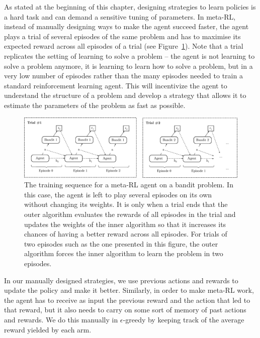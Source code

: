 As stated at the beginning of this chapter, designing strategies to learn
policies is a hard task and can demand a sensitive tuning of parameters.
In meta-RL, instead of manually designing ways to make the agent succeed faster,
the agent plays a trial of several episodes of the same problem and has to
maximise its expected reward across all episodes of a trial (see 
Figure~\ref{fig:meta_bandit_training}). Note that a trial replicates the setting
of learning to solve a problem -- the agent is not learning to solve a 
problem anymore, it is learning to learn how to solve a problem, but in 
a very low number of episodes rather than the many episodes needed 
to train a standard reinforcement learning agent. This will incentivize the agent
to understand the structure of a problem and develop a strategy that allows it 
to estimate the parameters of the problem as fast as possible.\\

\begin{figure}
	\centering
	\includegraphics[width=\linewidth]{fig/meta_bandit_training.eps}
	\caption{The training sequence for a meta-RL agent on a bandit problem.
	In this case, the agent is left to play several episodes on its own
	without changing its weights. It is only when a trial ends that the
	outer algorithm evaluates the rewards of all episodes in the trial and
	updates the weights of the inner algorithm so that it increases its
	chances of having a better reward across all episodes. For trials of 
	two episodes such as the one presented in this figure, the outer
	algorithm forces the inner algorithm to learn the problem in 
	two episodes.}
	\label{fig:meta_bandit_training}
\end{figure}

In our manually designed strategies, we use previous actions and rewards
to update the policy and make it better. Similarly, in order to
make meta-RL work, the agent has to receive as input the previous reward
and the action that led to that reward, but it also needs to carry on some
sort of memory of past actions and rewards. We do this manually in 
$\epsilon$-greedy by keeping track of the average reward yielded by each arm.\\


